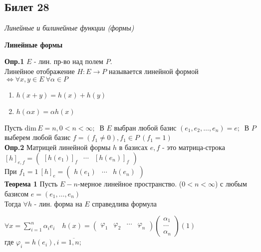 \subsection{Билет 28}

\textit{Линейные и билинейные функции (формы)}

\begin{center}
 \textbf{Линейные формы}
\end{center}

\textbf{Опр.1} $E$ - лин. пр-во над полем $P$. \\
Линейное отображение $H : E \to P$ называется линейной формой $\Leftrightarrow \forall x,y \in E\ \forall \alpha \in P\ $
\begin{enumerate}
 \item $h(x+y) = h(x) + h(y)$
 \item $h(\alpha x) = \alpha h(x)$
\end{enumerate}

Пусть $\mathrm{dim}\, E = n, 0 < n < \infty;\ $ В $E$ выбран любой базис $(e_1, e_2,\ldots, e_n) = e;\ $ В $P$ выберем любой базис $f = (f_1 \ne 0), f_1 \in P\ (f_1 = 1)$\\

\textbf{Опр.2} Матрицей линейной формы $h$  в базисах $e,f$ - это матрица-строка $[h]_{e,f} = \begin{pmatrix} [h(e_1)]_f & \cdots & [h(e_n)]_f  \end{pmatrix}$\\
При $f_1=1\ [h]_e = \begin{pmatrix} h(e_1) & \cdots & h(e_n) \end{pmatrix}$\\

\textbf{Теорема 1} Пусть $E - n$-мерное линейное пространство. ($0 < n < \infty$) с любым базисом $e=(e_1, \ldots, e_n)$\\
Тогда $\forall h$ - лин. форма на $E$ справедлива формула
 
$\forall x = \sum\limits_{i=1}^n \alpha_i e_i\quad h(x) = \begin{pmatrix} \varphi_1 & \varphi_2 & \cdots & \varphi_n \end{pmatrix} \begin{pmatrix} \alpha_1 \\ \cdots \\ \alpha_n \end{pmatrix} (1)$\\
где $\varphi_i = h(e_i), i = \overline{1,n}$; 

